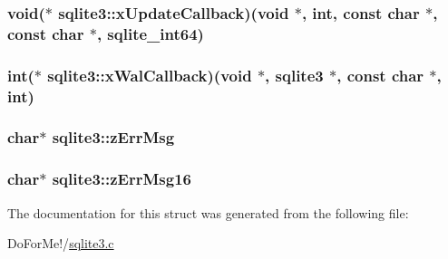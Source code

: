 \hypertarget{structsqlite3_a9177ce33e670ba38c97046e21482414a}{
\subsubsection[{x\-Update\-Callback}]{\setlength{\rightskip}{0pt plus 5cm}void($\ast$ sqlite3\-::x\-Update\-Callback)(void $\ast$, int, const char $\ast$, const char $\ast$, {\bf sqlite\-\_\-int64})}}\label{structsqlite3_a9177ce33e670ba38c97046e21482414a}
\hypertarget{structsqlite3_a895ca1f1d541060f1a43ac0267ab6437}{
\subsubsection[{x\-Wal\-Callback}]{\setlength{\rightskip}{0pt plus 5cm}int($\ast$ sqlite3\-::x\-Wal\-Callback)(void $\ast$, {\bf sqlite3} $\ast$, const char $\ast$, int)}}\label{structsqlite3_a895ca1f1d541060f1a43ac0267ab6437}
\hypertarget{structsqlite3_a6227734abcc20349f2964c79cc267860}{
\subsubsection[{z\-Err\-Msg}]{\setlength{\rightskip}{0pt plus 5cm}char$\ast$ sqlite3\-::z\-Err\-Msg}}\label{structsqlite3_a6227734abcc20349f2964c79cc267860}
\hypertarget{structsqlite3_ac127667e438cda63969cc5f027522be1}{
\subsubsection[{z\-Err\-Msg16}]{\setlength{\rightskip}{0pt plus 5cm}char$\ast$ sqlite3\-::z\-Err\-Msg16}}\label{structsqlite3_ac127667e438cda63969cc5f027522be1}


The documentation for this struct was generated from the following file\-:\begin{DoxyCompactItemize}
\item 
Do\-For\-Me!/\hyperlink{sqlite3_8c}{sqlite3.\-c}\end{DoxyCompactItemize}
